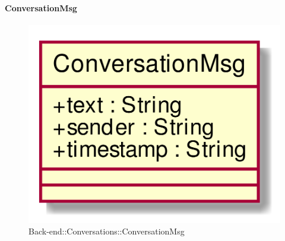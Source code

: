 \hypertarget{ConversationMsg_label}{\paragraph{ConversationMsg}}
\begin{figure}[h]
	\centering
	\includegraphics[width=\textwidth,height=\textheight,keepaspectratio]{images/ClassConversationMsg.png}
	\caption{Back-end::Conversations::ConversationMsg}
\end{figure}

